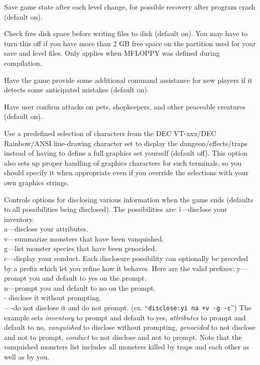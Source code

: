 \item[\ib{checkpoint}]
Save game state after each level change, for possible recovery after
program crash (default on).

\item[\ib{checkspace}]
Check free disk space before writing files to disk (default on).
You may have to turn this off if you have more than 2 GB free space
on the partition used for your save and level files.
Only applies when MFLOPPY was defined during compilation.

\item[\ib{cmdassist}]
Have the game provide some additional command assistance for 
new players if it detects some anticipated mistakes (default on).

\item[\ib{confirm}]
Have user confirm attacks on pets, shopkeepers, and other
peaceable creatures (default on).

\item[\ib{DECgraphics}]
Use a predefined selection of characters from the DEC VT-xxx/DEC
Rainbow/ANSI line-drawing character set to display the dungeon/effects/traps
instead of having to define a full graphics set yourself (default off).
This option also sets up proper handling of graphics
characters for such terminals, so you should specify it when appropriate
even if you override the selections with your own graphics strings.

\item[\ib{disclose}]
Controls options for disclosing various information when the game ends (defaults
to all possibilities being disclosed).
The possibilities are:
i---disclose your inventory.\\
a---disclose your attributes.\\
v---summarize monsters that have been vanquished.\\
g---list monster species that have been genocided.\\
c---display your conduct.
Each disclosure possibility can optionally be preceded by a prefix which
let you refine how it behaves. Here are the valid prefixes:
y---prompt you and default to yes on the prompt.\\
n---prompt you and default to no on the prompt.\\
- disclose it without prompting.\\
----do not disclose it and do not prompt.
(ex. ``{\tt disclose:yi na +v -g -c}'')
The example sets 
{\it inventory\/} 
to prompt and default to yes,
{\it attributes\/} 
to prompt and default to no,
{\it vanquished\/} 
to disclose without prompting,
{\it genocided\/} 
to not disclose and not to prompt,
{\it conduct\/} 
to not disclose and not to prompt.
Note that the vanquished monsters list includes all monsters killed by
traps and each other as well as by you.

